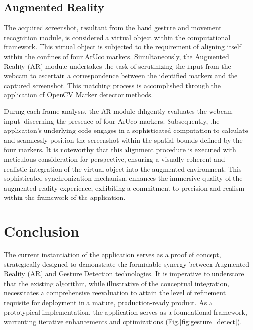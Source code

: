 \documentclass[journal]{IEEEtran}
\begin{document}
\subsection*{Augmented Reality}

The acquired screenshot, resultant from the hand gesture and movement recognition module, is considered a virtual object within the 
computational framework. This virtual object is subjected to the requirement of aligning itself within the confines of four ArUco markers. 
Simultaneously, the Augmented Reality (AR) module undertakes the task of scrutinizing the input from the webcam to ascertain a correspondence 
between the identified markers and the captured screenshot. This matching process is accomplished through the application of OpenCV 
Marker detector methods.

During each frame analysis, the AR module diligently evaluates the webcam input, discerning the presence of four ArUco markers. Subsequently, 
the application's underlying code engages in a sophisticated computation to calculate and seamlessly position the screenshot within the 
spatial bounds defined by the four markers. It is noteworthy that this alignment procedure is executed with meticulous consideration for 
perspective, ensuring a visually coherent and realistic integration of the virtual object into the augmented environment. This sophisticated 
synchronization mechanism enhances the immersive quality of the augmented reality experience, exhibiting a commitment to precision and 
realism within the framework of the application.

\section{Conclusion}
The current instantiation of the application serves as a proof of concept, strategically designed to demonstrate the formidable synergy 
between Augmented Reality (AR) and Gesture Detection technologies. It is imperative to underscore that the existing algorithm, while 
illustrative of the conceptual integration, necessitates a comprehensive reevaluation to attain the level of refinement requisite for 
deployment in a mature, production-ready product. As a prototypical implementation, the application serves as a foundational framework, 
warranting iterative enhancements and optimizations (Fig.\ref{fig:gesture_detect}).
\end{document}
